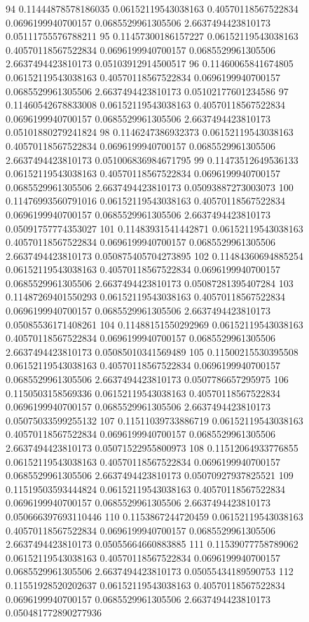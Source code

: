 {94 0.11444878578186035 0.06152119543038163 0.40570118567522834 0.0696199940700157 0.0685529961305506 2.6637494423810173 0.05111755576788211
95 0.11457300186157227 0.06152119543038163 0.40570118567522834 0.0696199940700157 0.0685529961305506 2.6637494423810173 0.05103912914500517
96 0.11460065841674805 0.06152119543038163 0.40570118567522834 0.0696199940700157 0.0685529961305506 2.6637494423810173 0.05102177601234586
97 0.11460542678833008 0.06152119543038163 0.40570118567522834 0.0696199940700157 0.0685529961305506 2.6637494423810173 0.05101880279241824
98 0.1146247386932373 0.06152119543038163 0.40570118567522834 0.0696199940700157 0.0685529961305506 2.6637494423810173 0.051006836984671795
99 0.11473512649536133 0.06152119543038163 0.40570118567522834 0.0696199940700157 0.0685529961305506 2.6637494423810173 0.05093887273003073
100 0.11476993560791016 0.06152119543038163 0.40570118567522834 0.0696199940700157 0.0685529961305506 2.6637494423810173 0.05091757774353027
101 0.11483931541442871 0.06152119543038163 0.40570118567522834 0.0696199940700157 0.0685529961305506 2.6637494423810173 0.050875405704273895
102 0.11484360694885254 0.06152119543038163 0.40570118567522834 0.0696199940700157 0.0685529961305506 2.6637494423810173 0.05087281395407284
103 0.11487269401550293 0.06152119543038163 0.40570118567522834 0.0696199940700157 0.0685529961305506 2.6637494423810173 0.05085536171408261
104 0.11488151550292969 0.06152119543038163 0.40570118567522834 0.0696199940700157 0.0685529961305506 2.6637494423810173 0.05085010341569489
105 0.11500215530395508 0.06152119543038163 0.40570118567522834 0.0696199940700157 0.0685529961305506 2.6637494423810173 0.0507786657295975
106 0.1150503158569336 0.06152119543038163 0.40570118567522834 0.0696199940700157 0.0685529961305506 2.6637494423810173 0.05075033599255132
107 0.11511039733886719 0.06152119543038163 0.40570118567522834 0.0696199940700157 0.0685529961305506 2.6637494423810173 0.05071522955800973
108 0.11512064933776855 0.06152119543038163 0.40570118567522834 0.0696199940700157 0.0685529961305506 2.6637494423810173 0.05070927937825521
109 0.11519503593444824 0.06152119543038163 0.40570118567522834 0.0696199940700157 0.0685529961305506 2.6637494423810173 0.050666397693110446
110 0.1153867244720459 0.06152119543038163 0.40570118567522834 0.0696199940700157 0.0685529961305506 2.6637494423810173 0.05055664660883885
111 0.11539077758789062 0.06152119543038163 0.40570118567522834 0.0696199940700157 0.0685529961305506 2.6637494423810173 0.05055434189590753
112 0.11551928520202637 0.06152119543038163 0.40570118567522834 0.0696199940700157 0.0685529961305506 2.6637494423810173 0.050481772890277936
}
